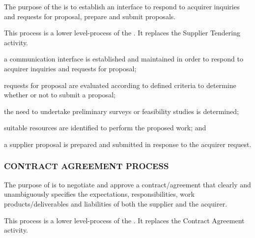 			\begin{adjustwidth}{2em}{0pt} 

				The purpose of the  is to establish an interface to respond to acquirer inquiries and requests for proposal, prepare and submit proposals.

				This process is a lower level-process of the . It replaces the Supplier Tendering activity.

			\end{adjustwidth}

			\begin{adjustwidth}{2em}{0pt} 

				\begin{compactitem}

					\item a communication interface is established and maintained in order to respond to acquirer inquiries and requests for proposal;

					\item requests for proposal are evaluated according to defined criteria to determine whether or not to submit a proposal;

					\item the need to undertake preliminary surveys or feasibility studies is determined;

					\item suitable resources are identified to perform the proposed work; and

					\item a supplier proposal is prepared and submitted in response to the acquirer request.

				\end{compactitem}

			\end{adjustwidth}

		\subsubsection{CONTRACT AGREEMENT PROCESS\label{llproc:contract_agreement_process}}

			\begin{adjustwidth}{2em}{0pt} 
				
				The purpose of  is to negotiate and approve a contract/agreement that clearly and unambiguously specifies the expectations, responsibilities, work products/deliverables and liabilities of both the supplier and the acquirer.

				This process is a lower level-process of the . It replaces the Contract Agreement activity.

			\end{adjustwidth}


